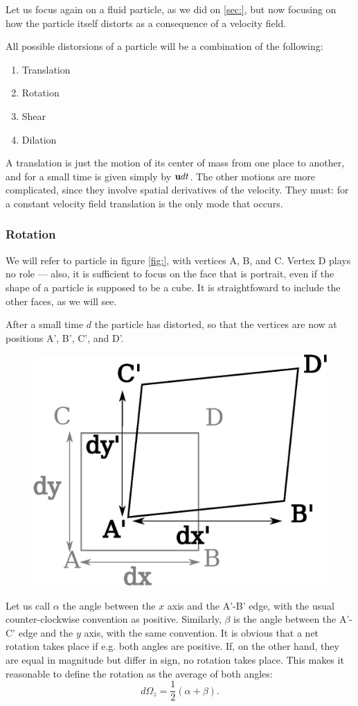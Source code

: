Let us focus again on a fluid particle, as we did on \ref{sec:}, but
now focusing on how the particle itself distorts as a consequence of a
velocity field.

All possible distorsions of a particle will be a combination of the
following:
\begin{enumerate}
 \item Translation
 \item Rotation
 \item Shear
 \item Dilation
\end{enumerate}

A translation is just the motion of its center of mass from one place
to another, and for a small time is given simply by $\mathbf{u} dt$. The
other motions are more complicated, since they involve spatial
derivatives of the velocity. They must: for a constant velocity field
translation is the only mode that occurs.

\subsubsection{Rotation}

We will refer to particle in figure \ref{fig:}, with vertices A, B,
and C. Vertex D plays no role --- also, it is sufficient to focus on
the face that is portrait, even if the shape of a particle is supposed
to be a cube. It is straightfoward to include the other faces, as we
will see.

After a small time $d$ the particle has distorted, so that the
vertices are now at positions A', B', C', and D'.

\begin{figure}
  \centering
  \includegraphics[width=0.4\linewidth]{figures/particle0}
  \caption{\label{fig:particle0}}
\end{figure}



Let us call $\alpha$ the angle between the $x$ axis and the A'-B'
edge, with the usual counter-clockwise convention as
positive. Similarly, $\beta$ is the angle between the A'-C' edge and
the $y$ axis, with the same convention. It is obvious that a net
rotation takes place if e.g. both angles are positive. If, on the
other hand, they are equal in magnitude but differ in sign, no
rotation takes place. This makes it reasonable to define the
rotation as the average of both angles:
\[
d\Omega_z = \frac12
\left(
        \alpha + \beta
\right) .
\]


